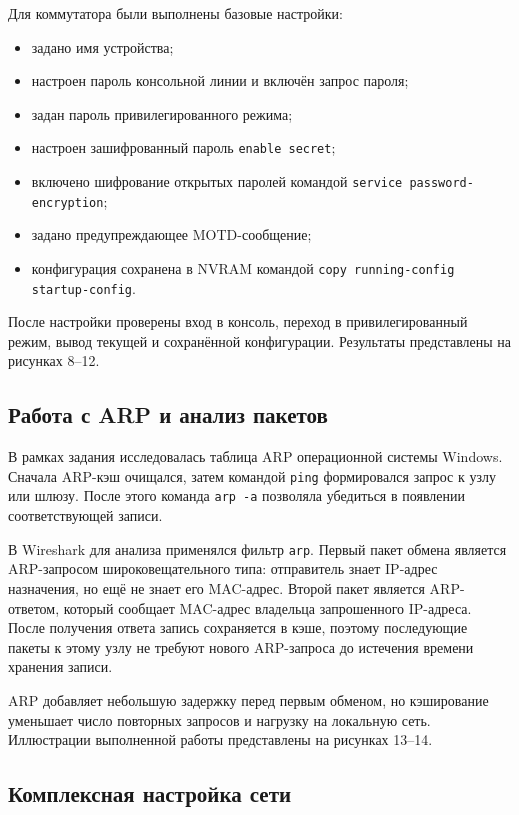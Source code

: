 \documentclass[a4paper,14pt,oneside]{extarticle}
\begin{document}
Для коммутатора были выполнены базовые настройки:
\begin{itemize}
\item задано имя устройства;
\item настроен пароль консольной линии и включён запрос пароля;
\item задан пароль привилегированного режима;
\item настроен зашифрованный пароль \texttt{enable secret};
\item включено шифрование открытых паролей командой
\texttt{service password-encryption};
\item задано предупреждающее MOTD-сообщение;
\item конфигурация сохранена в NVRAM командой
\texttt{copy running-config startup-config}.
\end{itemize}

После настройки проверены вход в консоль, переход в привилегированный режим,
вывод текущей и сохранённой конфигурации. Результаты представлены на рисунках
8--12.

\subsection{Работа с ARP и анализ пакетов}

В рамках задания исследовалась таблица ARP операционной системы Windows.
Сначала ARP-кэш очищался, затем командой \texttt{ping} формировался запрос к
узлу или шлюзу. После этого команда \texttt{arp -a} позволяла убедиться в
появлении соответствующей записи.

В Wireshark для анализа применялся фильтр \texttt{arp}. Первый пакет обмена
является ARP-запросом широковещательного типа: отправитель знает IP-адрес
назначения, но ещё не знает его MAC-адрес. Второй пакет является ARP-ответом,
который сообщает MAC-адрес владельца запрошенного IP-адреса. После получения
ответа запись сохраняется в кэше, поэтому последующие пакеты к этому узлу не
требуют нового ARP-запроса до истечения времени хранения записи.

ARP добавляет небольшую задержку перед первым обменом, но кэширование уменьшает
число повторных запросов и нагрузку на локальную сеть. Иллюстрации выполненной
работы представлены на рисунках 13--14.

\subsection{Комплексная настройка сети}
\end{document}
